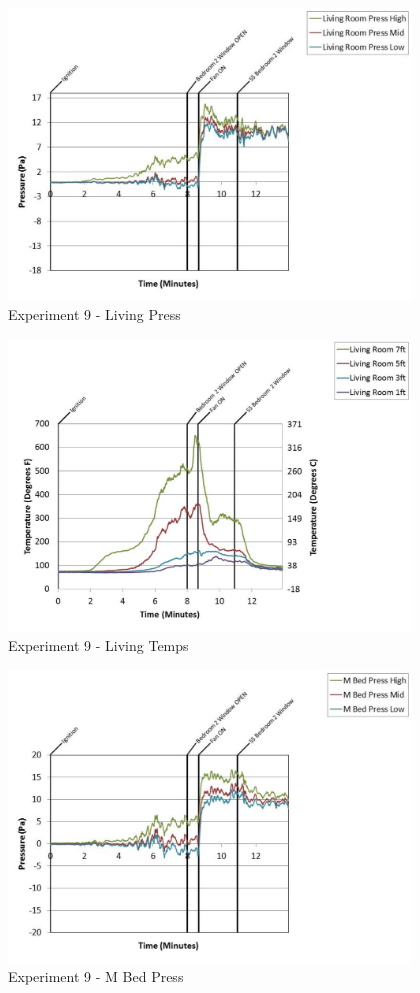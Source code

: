 \documentclass{article}
\begin{document}
\begin{appendices}
	\clearpage

	\begin{figure}[h!]
		\centering
		\includegraphics[height=3.05in]{0_Images/Results_Charts/Exp_9_Charts/LivingPress.pdf}
		\caption{Experiment 9 - Living Press}
	\end{figure}
 

	\begin{figure}[h!]
		\centering
		\includegraphics[height=3.05in]{0_Images/Results_Charts/Exp_9_Charts/LivingTemps.pdf}
		\caption{Experiment 9 - Living Temps}
	\end{figure}
 
	\clearpage

	\begin{figure}[h!]
		\centering
		\includegraphics[height=3.05in]{0_Images/Results_Charts/Exp_9_Charts/MBedPress.pdf}
		\caption{Experiment 9 - M Bed Press}
	\end{figure}
 


\end{appendices}
\end{document}
